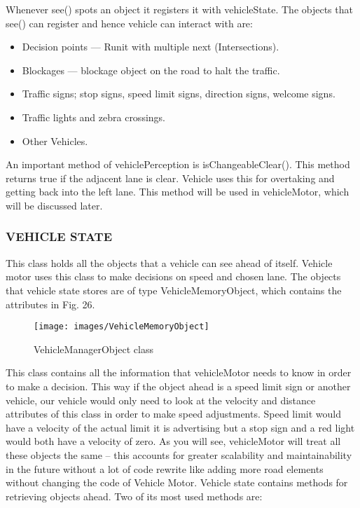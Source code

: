 \documentclass[11pt,a4paper]{article}
\begin{document}
Whenever see() spots an object it registers it with vehicleState. The objects that see() can register and hence vehicle can interact with are:
	
	\begin{itemize}
		\item Decision points --- Runit with multiple next (Intersections).
		\item Blockages --- blockage object on the road to halt the traffic.
		\item Traffic signs; stop signs, speed limit signs, direction signs, welcome signs.
		\item Traffic lights and zebra crossings.
		\item Other Vehicles.
	\end{itemize}
	
	An important method of vehiclePerception is isChangeableClear(). This method returns true if the adjacent lane is clear. Vehicle uses this for overtaking and getting back into the left lane. This method will be used in vehicleMotor, which will be discussed later.
  
  \subsubsection{VEHICLE STATE}
  
  This class holds all the objects that a vehicle can see ahead of itself. Vehicle motor uses this class to make decisions on speed and chosen lane.
The objects that vehicle state stores are of type VehicleMemoryObject, which contains the attributes in Fig. 26.

  		\begin{figure}[h!]
			\texttt{[image: images/VehicleMemoryObject]}
			\caption{VehicleManagerObject class}
			\centering
		\end{figure} 
		
		This class contains all the information that vehicleMotor needs to know in order to make a decision. This way if the object ahead is a speed limit sign or another vehicle, our vehicle would only need to look at the velocity and distance attributes of this class in order to make speed adjustments. Speed limit would have a velocity of the actual limit it is advertising but a stop sign and a red light would both have a velocity of zero. As you will see, vehicleMotor will treat all these objects the same – this accounts for greater scalability and maintainability in the future without a lot of code rewrite like adding more road elements without changing the code of Vehicle Motor.
			Vehicle state contains methods for retrieving objects ahead. Two of its most used methods are:
		
\end{document}

